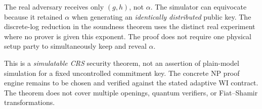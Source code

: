 \begin{remark}
The real adversary receives
only $(g,h)$, not $\alpha$.
The simulator can equivocate
because it retained
$\alpha$ when generating
an \emph{identically
distributed} public key.
The discrete-log reduction
in the soundness theorem
uses the distinct real
experiment where no prover
is given this exponent.
The proof does not require
one physical setup party to
simultaneously keep and
reveal $\alpha$.
\end{remark}

\begin{remark}
This is a \emph{simulatable CRS}
security theorem, not an
assertion of plain-model
simulation for a fixed
uncontrolled commitment key.
The concrete NP proof
engine remains to be chosen
and verified against the
stated adaptive WI contract.
The theorem does not cover
multiple openings, quantum
verifiers, or Fiat--Shamir
transformations.
\end{remark}
